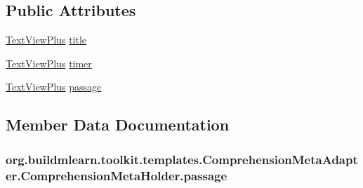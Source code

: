 \subsection*{Public Attributes}
\begin{DoxyCompactItemize}
\item 
\hyperlink{classorg_1_1buildmlearn_1_1toolkit_1_1views_1_1TextViewPlus}{Text\+View\+Plus} \hyperlink{classorg_1_1buildmlearn_1_1toolkit_1_1templates_1_1ComprehensionMetaAdapter_1_1ComprehensionMetaHolder_a8402aa0e7e45bbc61431b2dc10cae0e8}{title}
\item 
\hyperlink{classorg_1_1buildmlearn_1_1toolkit_1_1views_1_1TextViewPlus}{Text\+View\+Plus} \hyperlink{classorg_1_1buildmlearn_1_1toolkit_1_1templates_1_1ComprehensionMetaAdapter_1_1ComprehensionMetaHolder_a8aa98aa62ddcb7c7da064ba29b7fc7ec}{timer}
\item 
\hyperlink{classorg_1_1buildmlearn_1_1toolkit_1_1views_1_1TextViewPlus}{Text\+View\+Plus} \hyperlink{classorg_1_1buildmlearn_1_1toolkit_1_1templates_1_1ComprehensionMetaAdapter_1_1ComprehensionMetaHolder_ab88b0e260c231bbc7438efcf79f19a91}{passage}
\end{DoxyCompactItemize}


\subsection{Member Data Documentation}
\subsubsection[{\texorpdfstring{passage}{passage}}]{ org.\+buildmlearn.\+toolkit.\+templates.\+Comprehension\+Meta\+Adapter.\+Comprehension\+Meta\+Holder.\+passage}\hypertarget{classorg_1_1buildmlearn_1_1toolkit_1_1templates_1_1ComprehensionMetaAdapter_1_1ComprehensionMetaHolder_ab88b0e260c231bbc7438efcf79f19a91}{}\label{classorg_1_1buildmlearn_1_1toolkit_1_1templates_1_1ComprehensionMetaAdapter_1_1ComprehensionMetaHolder_ab88b0e260c231bbc7438efcf79f19a91}
